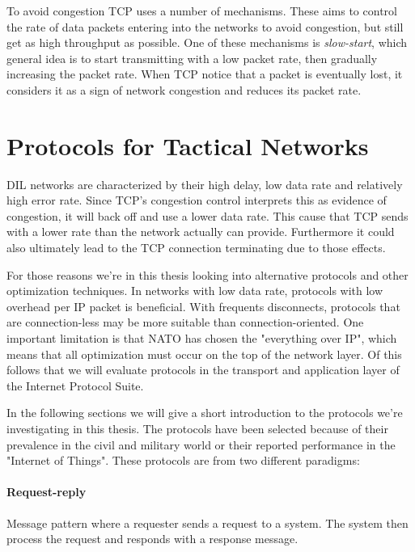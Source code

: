 To avoid congestion TCP uses a number of mechanisms. These aims to control the
rate of data packets entering into the networks to avoid congestion, but still
get as high throughput as possible. One of these mechanisms is
\textit{slow-start}, which general idea is to start transmitting with a low
packet rate, then gradually increasing the packet rate. When TCP notice that a
packet is eventually lost, it considers it as a sign of network congestion and
reduces its packet rate.

\section{Protocols for Tactical Networks}

DIL networks are characterized by their high delay, low data rate and relatively
high error rate. Since TCP's congestion control interprets this as evidence of
congestion, it will back off and use a lower data rate. This cause that TCP
sends with a lower rate than the network actually can provide. Furthermore it
could also ultimately lead to the TCP connection terminating due to those
effects\cite{nato-disadvantaged-grids}.

For those reasons we're in this thesis looking into alternative protocols and
other optimization techniques. In networks with low data rate, protocols with
low overhead per IP packet is beneficial. With frequents disconnects, protocols
that are connection-less may be more suitable than connection-oriented. One
important limitation is that NATO has chosen the "everything over IP", which
means that all optimization must occur on the top of the network layer. Of this
follows that we will evaluate protocols in the transport and application layer
of the Internet Protocol Suite.

In the following sections we will give a short
introduction to the protocols we're investigating in this thesis. The protocols
have been selected because of their prevalence in the civil and military world
or their reported performance in the "Internet of Things". These protocols are
from two different paradigms:

\paragraph{Request-reply}

Message pattern where a requester sends a request to a system. The system then
process the request and responds with a response message.

